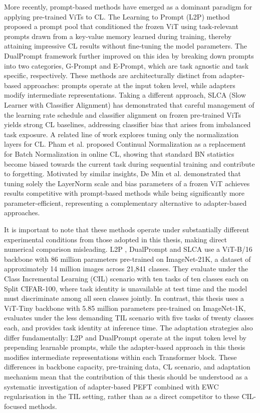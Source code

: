 \documentclass[english, LaM, oneside]{sapthesis}%
\numberwithin{equation}{chapter}
\begin{document}
More recently, prompt-based methods have emerged as a dominant paradigm for applying pre-trained ViTs to CL. The Learning to Prompt (L2P) method \cite{5} proposed a prompt pool that conditioned the frozen ViT using task-relevant prompts drawn from a key-value memory learned during training, thereby attaining impressive CL results without fine-tuning the model parameters. The DualPrompt framework \cite{41} further improved on this idea by breaking down prompts into two categories, G-Prompt and E-Prompt, which are task agnostic and task specific, respectively. These methods are architecturally distinct from adapter-based approaches: prompts operate at the input token level, while adapters modify intermediate representations. Taking a different approach, SLCA (Slow Learner with Classifier Alignment)\cite{slca} has demonstrated that careful management of the learning rate schedule and classifier alignment on frozen pre-trained ViTs yields strong CL baselines, addressing classifier bias that arises from imbalanced task exposure. A related line of work explores tuning only the normalization layers for CL. Pham et al.\cite{pham} proposed Continual Normalization as a replacement for Batch Normalization in online CL, showing that standard BN statistics become biased towards the current task during sequential training and contribute to forgetting. Motivated by similar insights, De Min et al.\cite{demin} demonstrated that tuning solely the LayerNorm scale and bias parameters of a frozen ViT achieves results competitive with prompt-based methods while being significantly more parameter-efficient, representing a complementary alternative to adapter-based approaches.

It is important to note that these methods operate under substantially different experimental conditions from those adopted in this thesis, making direct numerical comparison misleading. L2P \cite{5}, DualPrompt\cite{41} and SLCA\cite{slca} use a ViT-B/16 backbone with 86 million parameters pre-trained on ImageNet-21K, a dataset of approximately 14 million images across 21,841 classes. They evaluate under the Class Incremental Learning (CIL) scenario with ten tasks of ten classes each on Split CIFAR-100, where task identity is unavailable at test time and the model must discriminate among all seen classes jointly. In contrast, this thesis uses a ViT-Tiny backbone with 5.85 million parameters pre-trained on ImageNet-1K, evaluates under the less demanding TIL scenario with five tasks of twenty classes each, and provides task identity at inference time. The adaptation strategies also differ fundamentally: L2P \cite{5} and DualPrompt\cite{41} operate at the input token level by prepending learnable prompts, while the adapter-based approach in this thesis modifies intermediate representations within each Transformer block. These differences in backbone capacity, pre-training data, CL scenario, and adaptation mechanism mean that the contribution of this thesis should be understood as a systematic investigation of adapter-based PEFT combined with EWC regularisation in the TIL setting, rather than as a direct competitor to these CIL-focused methods.
\end{document}
